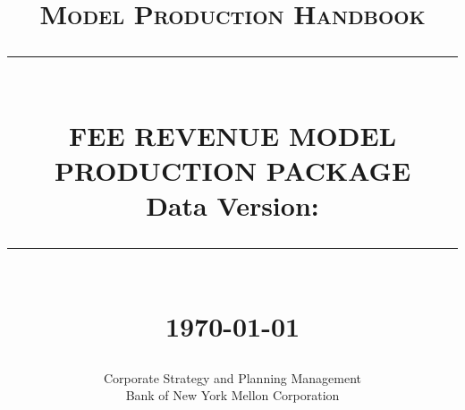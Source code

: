 \newcommand\OutputRevenueStructure{\Output/Document/RevenueStructure}
\newcommand\OutputComponent[1]{\Output/\version/\BU/Analysis-ComponentAnalysis-Segment-#1}
\newcommand\OutputSegmentation[1]{\Output/\version/\BU/Analysis-Materiality-Segment-#1}
\newcommand\OutputHistory[1]{\Output/\version/\BU/Analysis-History-Segment-#1}
\newcommand\OutputCCFExternal[1]{\Output/\version/\BU/Analysis-CrossCorrelation-External-Segment-#1}
\newcommand\OutputReg[1]{\Output/\version/\BU/Analysis-Regression-Segment-#1}
\newcommand\OutputRegQuarter[1]{\Output/\version/\BU/Analysis-Regression-Quarter-Segment-#1}
\newcommand\OutputDiffReg[1]{\Output/\version/\BU/Analysis-DiffRegression-Segment-#1}
\newcommand\OutputRegSummary[1]{\Output/\version/\BU/Regression-Summary-Segment-#1}
\newcommand\OutputMovingAverage[1]{\Output/\version/\BU/Analysis-MovingAverage-Segment-#1}
\newcommand\OutputSeasonal[1]{\Output/\version/\BU/Analysis-SeaonalDecomposition-Segment-#1}
\newcommand\OutputTSAnalysis[1]{\Output/\version/\BU/Analysis-TimeSeries-#1}

\newcommand\SeasonTime{0,1,2,3}
\newcommand\DiagnosticTest{0,1,2,3,4,5,6,7,8,9,10}
\newcommand\OutSampleTest{3,6,9,12,18,24}
\def\ModelSummaryNum{1,2,3,4,5,6,7,8,9,10,11,12,13,14,15,16,17,18,19,20}

\newcommand\CleanUp{\let\BU\undefined
\let\SegmentOne\undefined
\let\SegmentTwo\undefined
\let\SegmentThree\undefined
\let\SegmentsOneComponent\undefined
\let\SegmentsTwoComponent\undefined
\let\SegmentsThreeComponent\undefined
\let\SegmentsThreeComponent\ChampionSegment}


\newcommand{\HRule}[1]{\rule{\linewidth}{#1}} 	%

\makeatletter							%
\def\printtitle{%
    {\centering \@title\par}}
\makeatother

\makeatletter							%
\def\printauthor{%
    {\centering \large \@author}}
\makeatother

\title{	\normalsize \textsc{Model Production Handbook}%
		 	\\[2.0cm]													%
			\HRule{0.5pt} \\										%
			\LARGE \textbf{\uppercase{Fee Revenue Model Production Package}\\
			\large Data Version: \version}
			\HRule{2pt} \\ [0.5cm]								%
			\normalsize \today									%
		}

\author{
		Corporate Strategy and Planning Management\\
		Bank of New York Mellon Corporation\\
}
